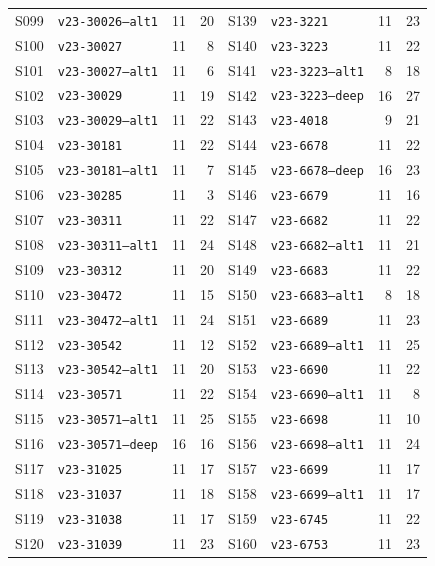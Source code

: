 \begin{table}[p]
\begin{tabular}{@{}llrr@{\qquad}llrr@{}}
S099 & \texttt{v23-30026--alt1} & 11 & 20 & S139 & \texttt{v23-3221} & 11 & 23\\
S100 & \texttt{v23-30027} & 11 & 8 & S140 & \texttt{v23-3223} & 11 & 22\\
S101 & \texttt{v23-30027--alt1} & 11 & 6 & S141 & \texttt{v23-3223--alt1} & 8 & 18\\
S102 & \texttt{v23-30029} & 11 & 19 & S142 & \texttt{v23-3223--deep} & 16 & 27\\
S103 & \texttt{v23-30029--alt1} & 11 & 22 & S143 & \texttt{v23-4018} & 9 & 21\\
S104 & \texttt{v23-30181} & 11 & 22 & S144 & \texttt{v23-6678} & 11 & 22\\
S105 & \texttt{v23-30181--alt1} & 11 & 7 & S145 & \texttt{v23-6678--deep} & 16 & 23\\
S106 & \texttt{v23-30285} & 11 & 3 & S146 & \texttt{v23-6679} & 11 & 16\\
S107 & \texttt{v23-30311} & 11 & 22 & S147 & \texttt{v23-6682} & 11 & 22\\
S108 & \texttt{v23-30311--alt1} & 11 & 24 & S148 & \texttt{v23-6682--alt1} & 11 & 21\\
S109 & \texttt{v23-30312} & 11 & 20 & S149 & \texttt{v23-6683} & 11 & 22\\
S110 & \texttt{v23-30472} & 11 & 15 & S150 & \texttt{v23-6683--alt1} & 8 & 18\\
S111 & \texttt{v23-30472--alt1} & 11 & 24 & S151 & \texttt{v23-6689} & 11 & 23\\
S112 & \texttt{v23-30542} & 11 & 12 & S152 & \texttt{v23-6689--alt1} & 11 & 25\\
S113 & \texttt{v23-30542--alt1} & 11 & 20 & S153 & \texttt{v23-6690} & 11 & 22\\
S114 & \texttt{v23-30571} & 11 & 22 & S154 & \texttt{v23-6690--alt1} & 11 & 8\\
S115 & \texttt{v23-30571--alt1} & 11 & 25 & S155 & \texttt{v23-6698} & 11 & 10\\
S116 & \texttt{v23-30571--deep} & 16 & 16 & S156 & \texttt{v23-6698--alt1} & 11 & 24\\
S117 & \texttt{v23-31025} & 11 & 17 & S157 & \texttt{v23-6699} & 11 & 17\\
S118 & \texttt{v23-31037} & 11 & 18 & S158 & \texttt{v23-6699--alt1} & 11 & 17\\
S119 & \texttt{v23-31038} & 11 & 17 & S159 & \texttt{v23-6745} & 11 & 22\\
S120 & \texttt{v23-31039} & 11 & 23 & S160 & \texttt{v23-6753} & 11 & 23\\
\bottomrule
\end{tabular}
\end{table}
